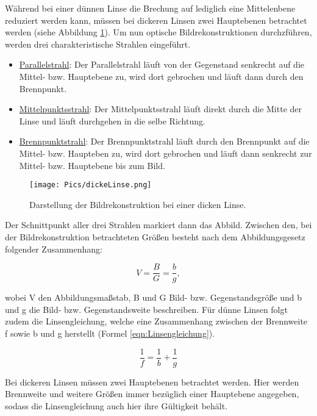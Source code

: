 Während bei einer dünnen Linse die Brechung auf lediglich eine Mittelenbene reduziert
werden kann, müssen bei dickeren Linsen zwei Hauptebenen betrachtet werden (siehe
Abbildung \ref{fig:dickeLinse}). Um nun optische Bildrekonstruktionen durchzführen, werden
drei charakteristische Strahlen eingeführt.

\begin{itemize}
  \item \underline{Parallelstrahl}: Der Parallelstrahl läuft von der Gegenstand
  senkrecht auf die Mittel- bzw. Hauptebene zu, wird dort gebrochen und läuft
  dann durch den Brennpunkt.
  \item \underline{Mittelpunktsstrahl}: Der Mittelpunktsstrahl läuft direkt durch
  die Mitte der Linse und läuft durchgehen in die selbe Richtung.
  \item \underline{Brennpunktstrahl}: Der Brennpunktstrahl läuft durch den Brennpunkt
  auf die Mittel- bzw.  Haupteben zu, wird dort gebrochen und läuft dann senkrecht
  zur Mittel- bzw. Hauptebene bis zum Bild.
\end{itemize}

\begin{figure}
  \centering
  \texttt{[image: Pics/dickeLinse.png]}
  \caption{Darstellung der Bildrekonstruktion bei einer dicken Linse.\cite{anleitung01}}
  \label{fig:dickeLinse}
\end{figure}

Der Schnittpunkt aller drei Strahlen markiert dann das Abbild. Zwischen den, bei der
Bildrekonstruktion betrachteten Größen besteht nach dem Abbildungsgesetz folgender
Zusammenhang:

\begin{equation}
  V = \frac{B}{G} = \frac{b}{g},
  \label{eqn:Abbildungsgesetz}
\end{equation}

wobei V den Abbildungsmaßstab, B und G Bild- bzw. Gegenstandsgröße und b und g die
Bild- bzw. Gegenstandsweite beschreiben. Für dünne Linsen folgt zudem die Linsengleichung,
welche eine Zusammenhang zwischen der Brennweite f sowie b und g herstellt (Formel
\eqref{eqn:Linsengleichung}).

\begin{equation}
\frac{1}{f} = \frac{1}{b} + \frac{1}{g}
\label{eqn:Linsengleichung}
\end{equation}

Bei dickeren Linsen müssen zwei Hauptebenen betrachtet
werden. Hier werden Brennweite und weitere Größen immer bezüglich einer Hauptebene
angegeben, sodass die Linsengleichung auch hier ihre Gültigkeit behält.

